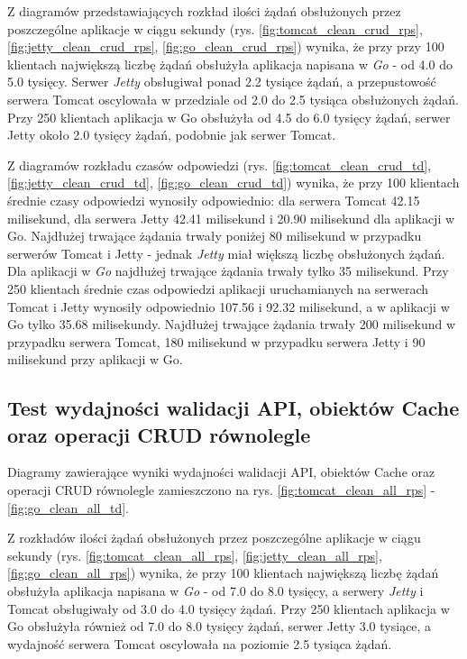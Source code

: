 Z diagramów przedstawiających rozkład ilości żądań obsłużonych przez poszczególne aplikacje w ciągu sekundy (rys. \ref{fig:tomcat_clean_crud_rps}, \ref{fig:jetty_clean_crud_rps}, \ref{fig:go_clean_crud_rps}) wynika, że przy przy 100 klientach największą liczbę żądań obsłużyła aplikacja napisana w \textsl{Go} - od 4.0 do 5.0 tysięcy. Serwer \textsl{Jetty} obsługiwał ponad 2.2 tysiące żądań, a przepustowość serwera Tomcat oscylowała w przedziale od 2.0 do 2.5 tysiąca obsłużonych żądań. Przy 250 klientach aplikacja w Go obsłużyła od 4.5 do 6.0 tysięcy żądań, serwer Jetty około 2.0 tysięcy żądań, podobnie jak serwer Tomcat.

Z diagramów rozkładu czasów odpowiedzi (rys. \ref{fig:tomcat_clean_crud_td}, \ref{fig:jetty_clean_crud_td}, \ref{fig:go_clean_crud_td}) wynika, że przy 100 klientach średnie czasy odpowiedzi wynosiły odpowiednio: dla serwera Tomcat 42.15  milisekund, dla serwera Jetty 42.41  milisekund i 20.90 milisekund dla aplikacji w Go.  Najdłużej trwające żądania trwały poniżej 80 milisekund w przypadku serwerów Tomcat i Jetty - jednak \textsl{Jetty} miał większą liczbę obsłużonych żądań. Dla aplikacji w \textsl{Go} najdłużej trwające żądania trwały tylko 35 milisekund. Przy 250 klientach średnie czas odpowiedzi aplikacji uruchamianych na serwerach Tomcat i Jetty  wynosiły  odpowiednio 107.56 i 92.32 milisekund, a w aplikacji w Go tylko 35.68 milisekundy. Najdłużej trwające żądania trwały 200 milisekund w przypadku serwera Tomcat, 180 milisekund w przypadku serwera Jetty i 90 milisekund przy aplikacji w Go. 

% 
\clearpage

\subsection{Test wydajności walidacji API, obiektów Cache oraz operacji CRUD równolegle}
Diagramy zawierające wyniki wydajności walidacji API, obiektów Cache oraz operacji CRUD równolegle zamieszczono na rys. \ref{fig:tomcat_clean_all_rps} - \ref{fig:go_clean_all_td}.                                                                  

Z rozkładów ilości żądań obsłużonych przez poszczególne aplikacje w ciągu sekundy (rys. \ref{fig:tomcat_clean_all_rps}, \ref{fig:jetty_clean_all_rps}, \ref{fig:go_clean_all_rps}) wynika, że przy 100 klientach największą liczbę żądań obsłużyła aplikacja napisana w \textsl{Go} - od 7.0 do 8.0 tysięcy, a serwery \textsl{Jetty} i Tomcat obsługiwały od 3.0 do 4.0  tysięcy żądań. Przy 250 klientach aplikacja w Go obsłużyła również od 7.0 do 8.0 tysięcy żądań, serwer Jetty 3.0 tysiące, a wydajność serwera Tomcat oscylowała na poziomie 2.5 tysiąca żądań. 
 
